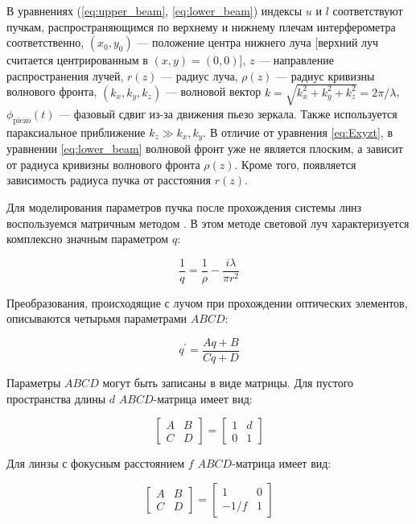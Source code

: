В уравнениях (\ref{eq:upper_beam}, \ref{eq:lower_beam}) индексы $u$ и $l$ соответствуют пучкам, распространяющимся по верхнему и нижнему плечам интерферометра соответственно, $(x_0, y_0)$ --- положение центра нижнего луча [верхний луч считается центрированным в $(x,y)=(0,0)$], $z$ --- направление распространения лучей, $r(z)$ --- радиус луча, $\rho(z)$ --- радиус кривизны волнового фронта, $(k_x,k_y,k_z)$ --- волновой вектор $k=\sqrt{k_x^2+k_y^2+k_z^2}=2\pi/\lambda$, $\phi_{\mathrm{piezo}}(t)$ --- фазовый сдвиг из-за движения пьезо зеркала. Также используется параксиальное приближение $k_z \gg k_x, k_y$. В отличие от уравнения \eqref{eq:Exyzt}, в уравнении \eqref{eq:lower_beam} волновой фронт уже не является плоским, а зависит от радиуса кривизны волнового фронта $\rho(z)$. Кроме того, появляется зависимость радиуса пучка от расстояния $r(z)$. 

Для моделирования параметров пучка после прохождения системы линз воспользуемся матричным методом \cite{gerrard2012introduction}. В этом методе световой луч характеризуется комплексно значным параметром $q$:

\begin{equation}
    \dfrac{1}{q} = \dfrac{1}{\rho} - \dfrac{i \lambda}{\pi r^2}   
\label{eq:q_param}
\end{equation}

Преобразования, происходящие с лучом при прохождении оптических элементов, описываются четырьмя параметрами $ABCD$: 

\begin{equation}
    q^{\prime}=\dfrac{A q+B}{C q+D}
\label{eq:q_prime}
\end{equation}

Параметры $ABCD$ могут быть записаны в виде матрицы. Для пустого пространства длины $d$ $ABCD$-матрица имеет вид: 

\begin{equation}
    \begin{bmatrix} A & B \\ C & D \end{bmatrix}=\begin{bmatrix} 1 & d \\ 0 & 1 \end{bmatrix}
\label{eq:abcd_free}
\end{equation}

Для линзы с фокусным расстоянием $f$ $ABCD$-матрица имеет вид: 

\begin{equation}
    \begin{bmatrix} A & B \\ C & D \end{bmatrix}=\begin{bmatrix} 1 & 0 \\ -1/f & 1 \end{bmatrix}
\label{eq:abcd_lens}
\end{equation}

